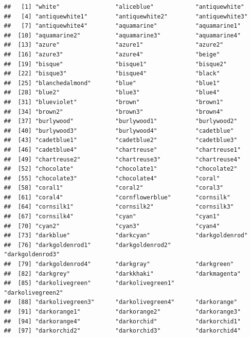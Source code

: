 \documentclass[]{book}
\begin{document}
\begin{verbatim}
##   [1] "white"                "aliceblue"            "antiquewhite"        
##   [4] "antiquewhite1"        "antiquewhite2"        "antiquewhite3"       
##   [7] "antiquewhite4"        "aquamarine"           "aquamarine1"         
##  [10] "aquamarine2"          "aquamarine3"          "aquamarine4"         
##  [13] "azure"                "azure1"               "azure2"              
##  [16] "azure3"               "azure4"               "beige"               
##  [19] "bisque"               "bisque1"              "bisque2"             
##  [22] "bisque3"              "bisque4"              "black"               
##  [25] "blanchedalmond"       "blue"                 "blue1"               
##  [28] "blue2"                "blue3"                "blue4"               
##  [31] "blueviolet"           "brown"                "brown1"              
##  [34] "brown2"               "brown3"               "brown4"              
##  [37] "burlywood"            "burlywood1"           "burlywood2"          
##  [40] "burlywood3"           "burlywood4"           "cadetblue"           
##  [43] "cadetblue1"           "cadetblue2"           "cadetblue3"          
##  [46] "cadetblue4"           "chartreuse"           "chartreuse1"         
##  [49] "chartreuse2"          "chartreuse3"          "chartreuse4"         
##  [52] "chocolate"            "chocolate1"           "chocolate2"          
##  [55] "chocolate3"           "chocolate4"           "coral"               
##  [58] "coral1"               "coral2"               "coral3"              
##  [61] "coral4"               "cornflowerblue"       "cornsilk"            
##  [64] "cornsilk1"            "cornsilk2"            "cornsilk3"           
##  [67] "cornsilk4"            "cyan"                 "cyan1"               
##  [70] "cyan2"                "cyan3"                "cyan4"               
##  [73] "darkblue"             "darkcyan"             "darkgoldenrod"       
##  [76] "darkgoldenrod1"       "darkgoldenrod2"       "darkgoldenrod3"      
##  [79] "darkgoldenrod4"       "darkgray"             "darkgreen"           
##  [82] "darkgrey"             "darkkhaki"            "darkmagenta"         
##  [85] "darkolivegreen"       "darkolivegreen1"      "darkolivegreen2"     
##  [88] "darkolivegreen3"      "darkolivegreen4"      "darkorange"          
##  [91] "darkorange1"          "darkorange2"          "darkorange3"         
##  [94] "darkorange4"          "darkorchid"           "darkorchid1"         
##  [97] "darkorchid2"          "darkorchid3"          "darkorchid4"         

\end{verbatim}
\end{document}

